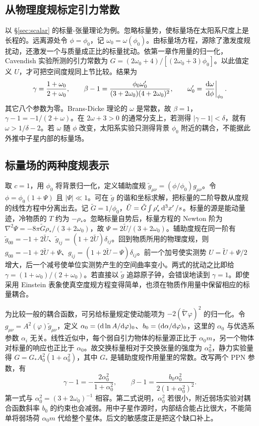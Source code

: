 \subsection{从物理度规标定引力常数}\label{sec:pn-bd-parameters}

以 \S\ref{sec:scalar} 的标量-张量理论为例。忽略标量势，使标量场在太阳系尺度上是长程的。远离源处令 $\phi=\phi_0$，记 $\omega_0=\omega(\phi_0)$。由标量场方程，源除了激发度规扰动，还激发一个与质量成正比的标量扰动。依第一章作用量的归一化，Cavendish 实验所测的引力常数为 $G=(2\omega_0+4)/[(2\omega_0+3)\phi_0]$。以此值定义 $U$，才可把空间度规同上节比较。结果为
\[
 \gamma=\frac{1+\omega_0}{2+\omega_0},\qquad
 \beta-1=\frac{\phi_0\omega'_0}{(3+2\omega_0)(4+2\omega_0)^2},\qquad
 \omega'_0=\left.\frac{\dd\omega}{\dd\phi}\right|_{\phi_0}.
\]
其它八个参数为零。Brans-Dicke 理论的 $\omega$ 是常数，故 $\beta=1$，$\gamma-1=-1/(2+\omega)$。在 $2\omega+3>0$ 的通常分支上，若测得 $|\gamma-1|<\delta$，就有 $\omega>1/\delta-2$。若 $\omega$ 随 $\phi$ 改变，太阳系实验只测得背景 $\phi_0$ 附近的耦合，不能据此外推中子星内部的标量场。

\subsection{标量场的两种度规表示}

取 $c=1$，用 $\phi_0$ 将背景归一化，定义辅助度规 $\tilde g_{\mu\nu}=(\phi/\phi_0)g_{\mu\nu}$。令 $\phi=\phi_0(1+\Psi)$ 且 $|\Psi|\ll1$。可在 $\tilde g$ 的谐和坐标求解，把标量的二阶导数从度规的线性方程中分离出去。记 $\tilde G=1/\phi_0$，$\tilde U=\tilde G\int\rho_*'\dd[3]{x'}/s$。标量的源是能动量迹，冷物质的 $T$ 约为 $-\rho_*$。忽略标量自势后，标量方程的 Newton 阶为 $\nabla^2\Psi=-8\pi\tilde G\rho_* /(3+2\omega_0)$，故 $\Psi=2\tilde U/(3+2\omega_0)$。辅助度规在同一阶有 $\tilde g_{00}=-1+2\tilde U$、$\tilde g_{ij}=(1+2\tilde U)\delta_{ij}$。回到物质所用的物理度规，则 $g_{00}=-1+2\tilde U+\Psi$、$g_{ij}=(1+2\tilde U-\Psi)\delta_{ij}$。前一个加号使实测势 $U=\tilde U+\Psi/2$ 增大，后一个减号使单位实测势产生的空间曲率变小。两式的扰动之比即给 $\gamma=(1+\omega_0)/(2+\omega_0)$。若直接以 $\tilde g$ 追踪原子钟，会错误地读到 $\gamma=1$。即使采用 Einstein 表象使真空度规方程变得简单，也须在物质作用量中保留相应的标量耦合。

为比较一般的耦合函数，可另给标量规定使动能项为 $-2(\tilde\nabla\varphi)^2$ 的归一化。令 $g_{\mu\nu}=A^2(\varphi)\tilde g_{\mu\nu}$，定义 $\alpha_0=(\dd\ln A/\dd\varphi)_0$、$b_0=(\dd\alpha/\dd\varphi)_0$，这里的 $\alpha_0$ 与优选系参数 $\alpha_i$ 无关。线性近似中，每个弱自引力物体的标量源正比于 $\alpha_0m$，另一个物体对标量的响应也正比于 $\alpha_0$。故交换标量相对于交换张量的强度为 $\alpha_0^2$，静力实验量得 $G=G_*A_0^2(1+\alpha_0^2)$，其中 $G_*$ 是辅助度规作用量里的常数。改写两个 PPN 参数，有
\[
 \gamma-1=-\frac{2\alpha_0^2}{1+\alpha_0^2},\qquad
 \beta-1=\frac{b_0\alpha_0^2}{2(1+\alpha_0^2)^2}.
\]
第一式与 $\alpha_0^2=(3+2\omega_0)^{-1}$ 相容。第二式说明，$\alpha_0^2$ 若很小，附近弱场实验对耦合函数斜率 $b_0$ 的约束也会减弱。用中子星作源时，内部结合能占比很大，不能简单将弱场荷 $\alpha_0m$ 代给整个星体。后文的敏感度正是把这个缺口补上。

